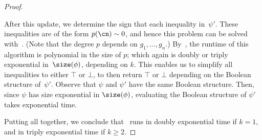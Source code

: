 \begin{proof}
\begin{description}
      After this update, we determine the sign that each inequality in~$\psi'$.
      These inequalities are of the form $p(\cn) \sim 0$, and hence this problem
      can be solved with~. (Note that the degree $p$
      depends on $g_1,\dots,g_n$.)
      By~, the runtime of this
      algorithm is polynomial in the size of $p$; which again is doubly or
      triply exponential in~$\size(\phi)$, depending on $k$. This enables us to
      simplify all inequalities to either $\top$ or $\bot$, to then return
      $\top$ or $\bot$ depending on the Boolean structure of~$\psi'$. Observe
      that $\psi$ and $\psi'$ have the same Boolean structure. Then, since
      $\psi$ has size exponential in $\size(\phi)$, evaluating the Boolean
      structure of $\psi'$ takes exponential time.
  \end{description}
  Putting all together, we conclude that~ 
  runs in doubly exponential time if $k = 1$, 
  and in triply exponential time if $k \geq 2$.
\end{proof}

